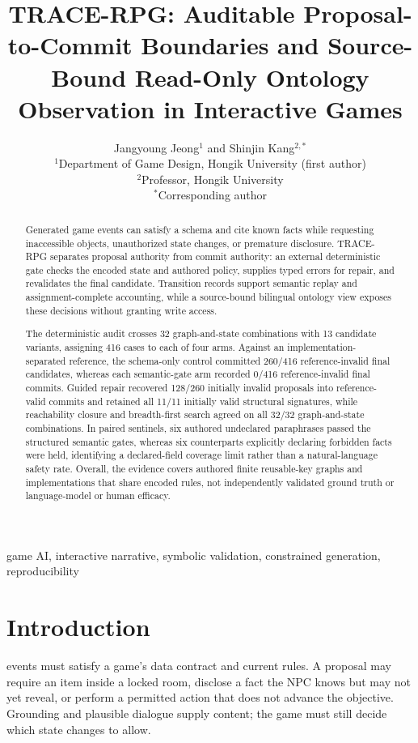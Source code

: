 \documentclass[journal]{IEEEtran}
\title{TRACE-RPG: Auditable Proposal-to-Commit Boundaries and Source-Bound Read-Only Ontology Observation in Interactive Games}
\author{Jangyoung Jeong$^{1}$ and Shinjin Kang$^{2,*}$\\
\small $^{1}$Department of Game Design, Hongik University (first author)\\
\small $^{2}$Professor, Hongik University\\
\small $^{*}$Corresponding author}
\newcommand{\system}{TRACE-RPG}
\begin{document}
\maketitle

\begin{abstract}
Generated game events can satisfy a schema and cite known facts while requesting inaccessible objects, unauthorized state changes, or premature disclosure. \system{} separates proposal authority from commit authority: an external deterministic gate checks the encoded state and authored policy, supplies typed errors for repair, and revalidates the final candidate. Transition records support semantic replay and assignment-complete accounting, while a source-bound bilingual ontology view exposes these decisions without granting write access.

The deterministic audit crosses 32 graph-and-state combinations with 13 candidate variants, assigning 416 cases to each of four arms. Against an implementation-separated reference, the schema-only control committed 260/416 reference-invalid final candidates, whereas each semantic-gate arm recorded 0/416 reference-invalid final commits. Guided repair recovered 128/260 initially invalid proposals into reference-valid commits and retained all 11/11 initially valid structural signatures, while reachability closure and breadth-first search agreed on all 32/32 graph-and-state combinations. In paired sentinels, six authored undeclared paraphrases passed the structured semantic gates, whereas six counterparts explicitly declaring forbidden facts were held, identifying a declared-field coverage limit rather than a natural-language safety rate. Overall, the evidence covers authored finite reusable-key graphs and implementations that share encoded rules, not independently validated ground truth or language-model or human efficacy.
\end{abstract}

\begin{IEEEkeywords}
game AI, interactive narrative, symbolic validation, constrained generation, reproducibility
\end{IEEEkeywords}

\section{Introduction}
 events must satisfy a game's data contract and current rules. A proposal may require an item inside a locked room, disclose a fact the NPC knows but may not yet reveal, or perform a permitted action that does not advance the objective. Grounding and plausible dialogue \cite{S03_weir2024ontologically,S20_ashby2023personalized} supply content; the game must still decide which state changes to allow.
\end{document}
